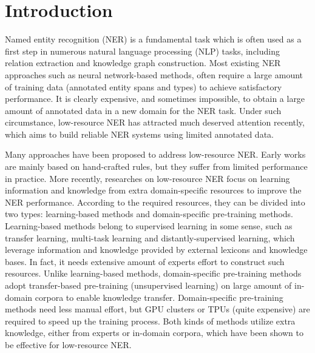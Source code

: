 \documentclass[10pt, conference, compsocconf]{IEEEtran}
\begin{document}
\section{Introduction}
Named entity recognition (NER) is a fundamental task which is often used as a first step 
in numerous natural language processing (NLP) tasks, including
relation extraction\cite{li2016biocreative,ren2017cotype} and knowledge graph construction\cite{lin2015learning,luan-etal-2018-multi}.
Most existing NER approaches such as neural network-based methods\cite{lample-etal-2016-neural,ma-hovy-2016-end,liu2018empower}, 
often require a large amount of training data (annotated entity spans and types) to achieve satisfactory performance.
It is clearly expensive, and sometimes
impossible, to obtain a large amount of annotated data in a new domain for the NER
task. Under such circumstance, low-resource NER has attracted much deserved attention recently,
which aims to build reliable NER systems using limited annotated data.


Many approaches have been proposed to address low-resource NER.
Early works are mainly based on hand-crafted rules\cite{collobert2011natural,yang2012extracting,luo2015joint}, but they suffer from limited performance in practice. 
More recently, researches on low-resource NER focus on learning information and knowledge from extra domain-specific resources to improve the NER performance.
According to the required resources, they can be divided into two types: 
learning-based methods\cite{luan-etal-2018-multi,zhou-etal-2019-dual,shang-etal-2018-learning} and domain-specific pre-training methods\cite{beltagy-etal-2019-scibert,lee2020biobert}. 
Learning-based methods belong to supervised learning in some sense, such as transfer learning, multi-task learning 
and distantly-supervised learning,
which leverage information and knowledge provided by external lexicons and knowledge bases. 
In fact, it needs extensive amount of experts effort to construct such  resources.
Unlike learning-based methods, domain-specific pre-training methods 
adopt transfer-based pre-training (unsupervised learning) on large amount of in-domain corpora to enable knowledge transfer. 
Domain-specific pre-training methods need less manual effort, but GPU clusters or TPUs (quite expensive) are required to speed up the training process.
Both kinds of methods utilize extra knowledge, either from experts or in-domain corpora,
which have been shown to be effective for low-resource NER.
\end{document}
